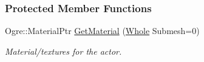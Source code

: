 \subsubsection*{Protected Member Functions}
\begin{DoxyCompactItemize}
\item 
\hypertarget{classphys_1_1ActorGraphicsSettings_ade1b760cc01187e9ffdeed8871533066}{
Ogre::MaterialPtr \hyperlink{classphys_1_1ActorGraphicsSettings_ade1b760cc01187e9ffdeed8871533066}{GetMaterial} (\hyperlink{namespacephys_a460f6bc24c8dd347b05e0366ae34f34a}{Whole} Submesh=0)}
\label{classphys_1_1ActorGraphicsSettings_ade1b760cc01187e9ffdeed8871533066}

\begin{DoxyCompactList}\small\item\em Material/textures for the actor. \item\end{DoxyCompactList}\end{DoxyCompactItemize}
